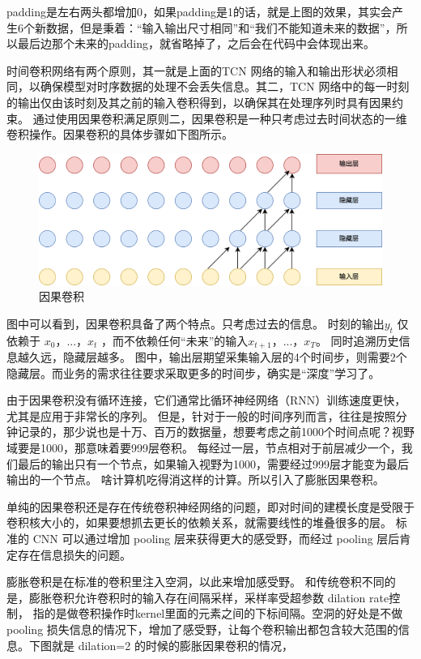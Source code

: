 padding是左右两头都增加0，如果padding是1的话，就是上图的效果，其实会产生6个新数据，但是秉着：“输入输出尺寸相同”和“我们不能知道未来的数据”，所以最后边那个未来的padding，就省略掉了，之后会在代码中会体现出来。

时间卷积网络有两个原则，其一就是上面的TCN 网络的输入和输出形状必须相同，以确保模型对时序数据的处理不会丢失信息。其二，TCN 网络中的每一时刻的输出仅由该时刻及其之前的输入卷积得到，以确保其在处理序列时具有因果约束。
通过使用因果卷积满足原则二，因果卷积是一种只考虑过去时间状态的一维卷积操作。因果卷积的具体步骤如下图所示。

\begin{figure}[htbp]
  \centering
  \includegraphics[width=\textwidth]{figures/causal_convolution.png}
  \caption{因果卷积}
\end{figure}

图中可以看到，因果卷积具备了两个特点。只考虑过去的信息。 时刻的输出$y_t$ 仅依赖于 $x_0，...，x_t$ ，而不依赖任何“未来”的输入$x_{t+1}，...，x_T$。
同时追溯历史信息越久远，隐藏层越多。 图中，输出层期望采集输入层的4个时间步，则需要2个隐藏层。而业务的需求往往要求采取更多的时间步，确实是“深度”学习了。

由于因果卷积没有循环连接，它们通常比循环神经网络（RNN）训练速度更快，尤其是应用于非常长的序列。
但是，针对于一般的时间序列而言，往往是按照分钟记录的，那少说也是十万、百万的数据量，想要考虑之前1000个时间点呢？视野域要是1000，那意味着要999层卷积。
每经过一层，节点相对于前层减少一个，我们最后的输出只有一个节点，如果输入视野为1000，需要经过999层才能变为最后输出的一个节点。
啥计算机吃得消这样的计算。所以引入了膨胀因果卷积。

单纯的因果卷积还是存在传统卷积神经网络的问题，即对时间的建模长度是受限于卷积核大小的，如果要想抓去更长的依赖关系，就需要线性的堆叠很多的层。
标准的 CNN 可以通过增加 pooling 层来获得更大的感受野，而经过 pooling 层后肯定存在信息损失的问题。

膨胀卷积是在标准的卷积里注入空洞，以此来增加感受野。
和传统卷积不同的是，膨胀卷积允许卷积时的输入存在间隔采样，采样率受超参数 dilation rate控制，
指的是做卷积操作时kernel里面的元素之间的下标间隔。空洞的好处是不做 pooling 损失信息的情况下，增加了感受野，让每个卷积输出都包含较大范围的信息。下图就是 dilation=2 的时候的膨胀因果卷积的情况，

